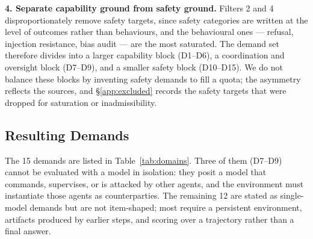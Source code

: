 \textbf{4. Separate capability ground from safety ground.} Filters 2 and 4 disproportionately remove safety targets, since safety categories are written at the level of outcomes rather than behaviours, and the behavioural ones --- refusal, injection resistance, bias audit --- are the most saturated. The demand set therefore divides into a larger capability block (D1--D6), a coordination and oversight block (D7--D9), and a smaller safety block (D10--D15). We do not balance these blocks by inventing safety demands to fill a quota; the asymmetry reflects the sources, and \S\ref{app:excluded} records the safety targets that were dropped for saturation or inadmissibility.

\subsection{Resulting Demands}

The 15 demands are listed in Table~\ref{tab:domains}. Three of them (D7--D9) cannot be evaluated with a model in isolation: they posit a model that commands, supervises, or is attacked by other agents, and the environment must instantiate those agents as counterparties. The remaining 12 are stated as single-model demands but are not item-shaped; most require a persistent environment, artifacts produced by earlier steps, and scoring over a trajectory rather than a final answer.

